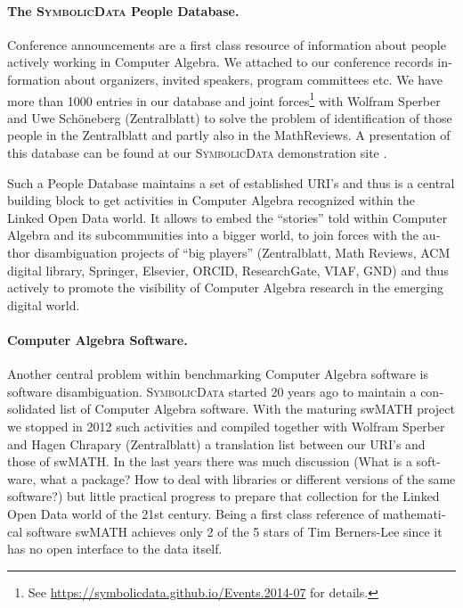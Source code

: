 \documentclass[11pt]{article}
\def\SD{\textsc{SymbolicData}}
\begin{document}
\begin{otherlanguage}{english}
\begin{multicols}{2}
\paragraph{The {\SD} People Database.}
Conference announcements are a first class resource of information about people
actively working in Computer Algebra.  We attached to our conference records
information about organizers, invited speakers, program committees etc.  We
have more than 1000 entries in our database and joint forces\footnote{See
  \url{https://symbolicdata.github.io/Events.2014-07} for details.} with
Wolfram Sperber and Uwe Sch\"oneberg (Zentralblatt) to solve the problem of
identification of those people in the Zentralblatt and partly also in the
MathReviews.  A presentation of this database can be found at our {\SD}
demonstration site \cite{sdinfo}.

Such a People Database maintains a set of established URI's and thus is a
central building block to get activities in Computer Algebra recognized within
the Linked Open Data world.  It allows to embed the ``stories'' told within
Computer Algebra and its subcommunities into a bigger world, to join forces
with the author disambiguation projects of ``big players'' (Zentralblatt, Math
Reviews, ACM digital library, Springer, Elsevier, ORCID, ResearchGate, VIAF,
GND) and thus actively to promote the visibility of Computer Algebra research
in the emerging digital world.

\paragraph{Computer Algebra Software.}
Another central problem within benchmarking Computer Algebra software is
software disambiguation. {\SD} started 20 years ago to maintain a consolidated
list of Computer Algebra software. With the maturing swMATH project
\cite{swmath} we stopped in 2012 such activities and compiled together with
Wolfram Sperber and Hagen Chrapary (Zentralblatt) a translation list between
our URI's and those of swMATH. In the last years there was much discussion
(What is a software, what a package? How to deal with libraries or different
versions of the same software?)  but little practical progress to prepare that
collection for the Linked Open Data world of the 21st century. Being a first
class reference of mathematical software swMATH achieves only 2 of the 5 stars
of Tim Berners-Lee since it has no open interface to the data itself.


\end{multicols}
\end{otherlanguage}
\end{document}
